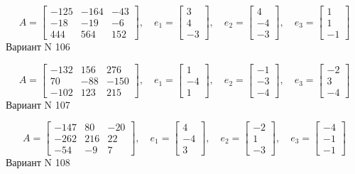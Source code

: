 \documentclass[11pt]{report}
\begin{document}
$$A = \left[\begin{matrix}-125 & -164 & -43\\-18 & -19 & -6\\444 & 564 & 152\end{matrix}\right],\quad e_1 = \left[\begin{matrix}3\\4\\-3\end{matrix}\right],\quad e_2 = \left[\begin{matrix}4\\-4\\-3\end{matrix}\right],\quad e_3 = \left[\begin{matrix}1\\1\\-1\end{matrix}\right]$$Вариант N 106

$$A = \left[\begin{matrix}-132 & 156 & 276\\70 & -88 & -150\\-102 & 123 & 215\end{matrix}\right],\quad e_1 = \left[\begin{matrix}1\\-4\\1\end{matrix}\right],\quad e_2 = \left[\begin{matrix}-1\\-3\\-4\end{matrix}\right],\quad e_3 = \left[\begin{matrix}-2\\3\\-4\end{matrix}\right]$$Вариант N 107

$$A = \left[\begin{matrix}-147 & 80 & -20\\-262 & 216 & 22\\-54 & -9 & 7\end{matrix}\right],\quad e_1 = \left[\begin{matrix}4\\-4\\3\end{matrix}\right],\quad e_2 = \left[\begin{matrix}-2\\1\\-3\end{matrix}\right],\quad e_3 = \left[\begin{matrix}-4\\-1\\-1\end{matrix}\right]$$Вариант N 108
\end{document}
